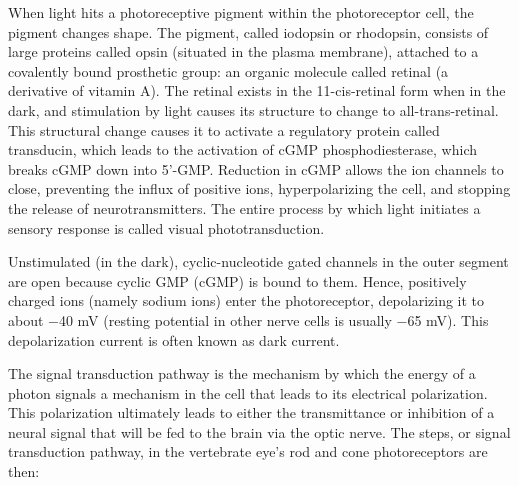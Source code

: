 \documentclass[]{book}
\begin{document}
When light hits a photoreceptive pigment within the photoreceptor cell, the pigment changes shape. The pigment, called iodopsin or rhodopsin, consists of large proteins called opsin (situated in the plasma membrane), attached to a covalently bound prosthetic group: an organic molecule called retinal (a derivative of vitamin A). The retinal exists in the 11-cis-retinal form when in the dark, and stimulation by light causes its structure to change to all-trans-retinal. This structural change causes it to activate a regulatory protein called transducin, which leads to the activation of cGMP phosphodiesterase, which breaks cGMP down into 5'-GMP. Reduction in cGMP allows the ion channels to close, preventing the influx of positive ions, hyperpolarizing the cell, and stopping the release of neurotransmitters. The entire process by which light initiates a sensory response is called visual phototransduction.

Unstimulated (in the dark), cyclic-nucleotide gated channels in the outer segment are open because cyclic GMP (cGMP) is bound to them. Hence, positively charged ions (namely sodium ions) enter the photoreceptor, depolarizing it to about −40 mV (resting potential in other nerve cells is usually −65 mV). This depolarization current is often known as dark current.

The signal transduction pathway is the mechanism by which the energy of a photon signals a mechanism in the cell that leads to its electrical polarization. This polarization ultimately leads to either the transmittance or inhibition of a neural signal that will be fed to the brain via the optic nerve. The steps, or signal transduction pathway, in the vertebrate eye's rod and cone photoreceptors are then:
\end{document}
